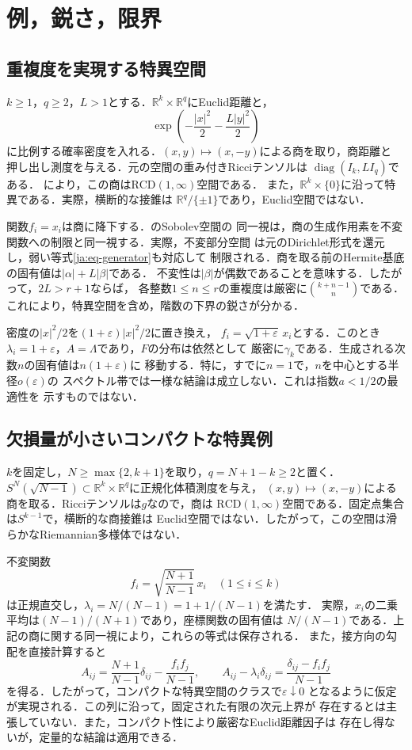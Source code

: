 \documentclass[12pt]{amsart}
\theoremstyle{definition}
\theoremstyle{remark}
\numberwithin{equation}{section}
\newcommand{\R}{\mathbb{R}}
\newcommand{\RCD}{\mathrm{RCD}}
\theoremstyle{jpplain}
\begin{document}
\section{例，鋭さ，限界}

\subsection{重複度を実現する特異空間}
$k\geq1$，$q\geq2$，$L>1$とする．$\R^k\times\R^q$にEuclid距離と，
\[
 \exp\left(-\frac{|x|^2}{2}-\frac{L|y|^2}{2}\right)
\]
に比例する確率密度を入れる．$(x,y)\mapsto(x,-y)$による商を取り，商距離と
押し出し測度を与える．元の空間の重み付きRicciテンソルは
$\operatorname{diag}(I_k,LI_q)$である．
\cite[Theorem 1.1]{ja:GGKMS}により，この商は$\RCD(1,\infty)$空間である．
また，$\R^k\times\{0\}$に沿って特異である．実際，横断的な接錐は
$\R^q/\{\pm1\}$であり，Euclid空間ではない．

関数$f_i=x_i$は商に降下する．\cite[Theorem 5.12]{ja:GGKMS}のSobolev空間の
同一視は，商の生成作用素を不変関数への制限と同一視する．実際，不変部分空間
は元のDirichlet形式を還元し，弱い等式\eqref{ja:eq-generator}も対応して
制限される．商を取る前のHermite基底の固有値は$|\alpha|+L|\beta|$である．
不変性は$|\beta|$が偶数であることを意味する．したがって，$2L>r+1$ならば，
各整数$1\leq n\leq r$の重複度は厳密に$\binom{k+n-1}{n}$である．
これにより，特異空間を含め，階数の下界の鋭さが分かる．

密度の$|x|^2/2$を$(1+\varepsilon)|x|^2/2$に置き換え，
$f_i=\sqrt{1+\varepsilon}\,x_i$とする．このとき
$\lambda_i=1+\varepsilon$，$A=\Lambda$であり，$F$の分布は依然として
厳密に$\gamma_k$である．生成される次数$n$の固有値は$n(1+\varepsilon)$に
移動する．特に，すでに$n=1$で，$n$を中心とする半径$o(\varepsilon)$の
スペクトル帯では一様な結論は成立しない．これは指数$a<1/2$の最適性を
示すものではない．

\subsection{欠損量が小さいコンパクトな特異例}
$k$を固定し，$N\geq\max\{2,k+1\}$を取り，$q=N+1-k\geq2$と置く．
$S^N(\sqrt{N-1})\subset\R^k\times\R^q$に正規化体積測度を与え，
$(x,y)\mapsto(x,-y)$による商を取る．Ricciテンソルは$g$なので，商は
$\RCD(1,\infty)$空間である．固定点集合は$S^{k-1}$で，横断的な商接錐は
Euclid空間ではない．したがって，この空間は滑らかなRiemannian多様体ではない．

不変関数
\[
 f_i=\sqrt{\frac{N+1}{N-1}}\,x_i
 \quad(1\leq i\leq k)
\]
は正規直交し，$\lambda_i=N/(N-1)=1+1/(N-1)$を満たす．
実際，$x_i$の二乗平均は$(N-1)/(N+1)$であり，座標関数の固有値は
$N/(N-1)$である．上記の商に関する同一視により，これらの等式は保存される．
また，接方向の勾配を直接計算すると
\[
 A_{ij}=\frac{N+1}{N-1}\delta_{ij}-\frac{f_i f_j}{N-1},
 \qquad
 A_{ij}-\lambda_i\delta_{ij}
 =\frac{\delta_{ij}-f_i f_j}{N-1}
\]
を得る．したがって，コンパクトな特異空間のクラスで$\varepsilon\downarrow0$
となるように仮定が実現される．この列に沿って，固定された有限の次元上界が
存在するとは主張していない．また，コンパクト性により厳密なEuclid距離因子は
存在し得ないが，定量的な結論は適用できる．
\end{document}
